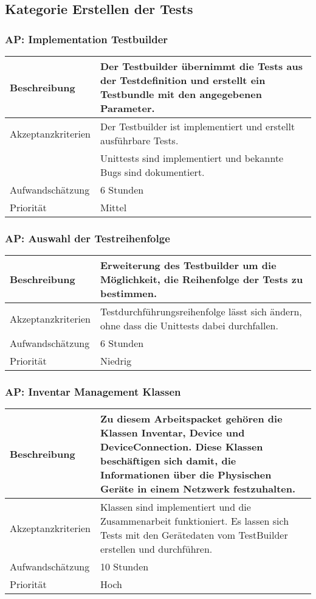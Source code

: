 \documentclass[
	ngerman,
	toc=listof, %
	toc=bibliography, %
	footnotes=multiple, %
	parskip=half, %
	numbers=noendperiod %
]{scrartcl}
\begin{document}
	\subsection{Kategorie Erstellen der Tests}

	\subsubsection{AP: Implementation Testbuilder}
	\begin{tabularx}{\textwidth}{lX}
		\toprule
		Beschreibung & Der Testbuilder übernimmt die Tests aus der Testdefinition und erstellt ein Testbundle mit den angegebenen Parameter. \\
		\midrule
		Akzeptanzkriterien & Der Testbuilder ist implementiert und erstellt ausführbare Tests.\\
		 & Unittests sind implementiert und bekannte Bugs sind dokumentiert. \\
		\midrule
		Aufwandschätzung & 6 Stunden\\
		\midrule
		Priorität & Mittel\\
		\bottomrule
	\end{tabularx}

	\subsubsection{AP: Auswahl der Testreihenfolge}
	\begin{tabularx}{\textwidth}{lX}
		\toprule
		Beschreibung & Erweiterung des Testbuilder um die Möglichkeit, die Reihenfolge der Tests zu bestimmen.\\
		\midrule
		Akzeptanzkriterien & Testdurchführungsreihenfolge lässt sich ändern, ohne dass die Unittests dabei durchfallen. \\
		\midrule
		Aufwandschätzung & 6 Stunden\\
		\midrule
		Priorität & Niedrig\\
		\bottomrule
	\end{tabularx}

	\subsubsection{AP: Inventar Management Klassen}
	\begin{tabularx}{\textwidth}{lX}
		\toprule
		Beschreibung & Zu diesem Arbeitspacket gehören die Klassen Inventar, Device und DeviceConnection. Diese Klassen beschäftigen sich damit, die Informationen über die Physischen Geräte in einem Netzwerk festzuhalten.\\
		\midrule
		Akzeptanzkriterien & Klassen sind implementiert und die Zusammenarbeit funktioniert. Es lassen sich Tests mit den Gerätedaten vom TestBuilder erstellen und durchführen.\\
		\midrule
		Aufwandschätzung & 10 Stunden\\
		\midrule
		Priorität & Hoch \\
		\bottomrule
	\end{tabularx}
	\newpage
\end{document}
